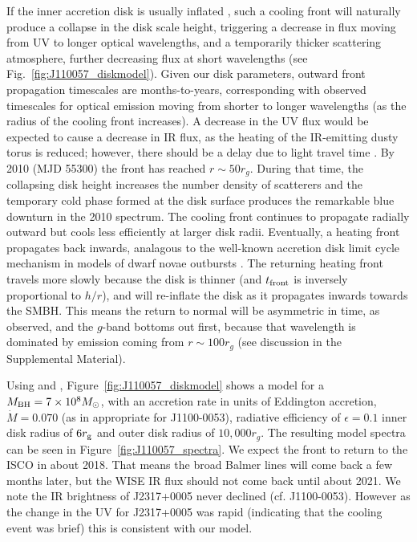 \documentclass{nature}
\begin{document}
If the inner accretion disk is usually inflated \cite[see e.g.,
][]{Sirko_Goodman2003, Thompson2005, Hopkins_Quataert2011}, such a
cooling front will naturally produce a collapse in the disk scale
height, 
triggering a decrease in flux moving from UV to longer optical
wavelengths, and a temporarily thicker scattering atmosphere, further
decreasing flux at short wavelengths (see
Fig.~\ref{fig:J110057_diskmodel}). 
Given our disk parameters,
outward front propagation timescales are months-to-years,
corresponding with observed timescales for
optical emission moving from shorter to longer wavelengths (as the
radius of the cooling front increases). A
decrease in the UV flux would be expected to cause a decrease in IR
flux, as the heating of the IR-emitting dusty torus is reduced;
however, there should be a delay due to light travel time
\cite[e.g., ][]{Jun2015}.
By 2010 (MJD 55300) the front has reached $r\sim50
r_{g}$. During that time, the collapsing disk height increases the
number density of scatterers and the temporary cold phase formed
at the disk surface produces the remarkable blue downturn in the 2010
spectrum. The cooling front continues to propagate radially outward
but cools less efficiently at larger disk radii. Eventually, a heating
front propagates back inwards, analagous to the well-known accretion
disk limit cycle mechanism in models of dwarf novae outbursts
\cite[e.g., ][]{Cannizzo1998}. The returning heating front travels
more slowly because the disk is thinner (and $t_{\rm front}$ is
inversely proportional to $h/r$), and will re-inflate the disk as it
propagates inwards towards the SMBH. This means the return to normal
will be asymmetric in time, as observed, and the $g$-band bottoms out
first, because that wavelength is dominated by emission coming from
$r\sim100r_{g}$ (see discussion in the Supplemental Material).

Using \cite{Ford2018} and \cite{Sirko_Goodman2003},
Figure~\ref{fig:J110057_diskmodel} shows a model for a $M_{\rm
BH}=7\times 10^{8} M_{\odot}$, with an accretion rate in units of
Eddington accretion, $\dot{M}=0.070$ (as in appropriate for
J1100-0053), radiative efficiency of $\epsilon=0.1$ inner disk radius
of $6r_{\rm g}$ and outer disk radius of $10,000 r_{g}$. The resulting
model spectra can be seen in Figure~\ref{fig:J110057_spectra}.  We
expect the front to return to the ISCO in about 2018. That means the
broad Balmer lines will come back a few months later, but the WISE IR
flux should not come back until about 2021. We note the IR brightness of
J2317+0005 never declined (cf. J1100-0053). However as the change in
the UV for J2317+0005 was rapid (indicating that the cooling event
was brief) this is consistent with our model.
\end{document}
